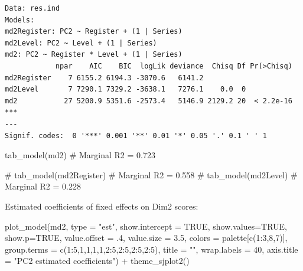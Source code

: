 \documentclass[
  letterpaper,
  DIV=11,
  numbers=noendperiod]{scrreprt}
\newenvironment{Shaded}{\begin{snugshade}}{\end{snugshade}}
\newcommand{\AttributeTok}[1]{\textcolor[rgb]{0.40,0.45,0.13}{#1}}
\newcommand{\CommentTok}[1]{\textcolor[rgb]{0.37,0.37,0.37}{#1}}
\newcommand{\ConstantTok}[1]{\textcolor[rgb]{0.56,0.35,0.01}{#1}}
\newcommand{\DecValTok}[1]{\textcolor[rgb]{0.68,0.00,0.00}{#1}}
\newcommand{\FloatTok}[1]{\textcolor[rgb]{0.68,0.00,0.00}{#1}}
\newcommand{\FunctionTok}[1]{\textcolor[rgb]{0.28,0.35,0.67}{#1}}
\newcommand{\NormalTok}[1]{\textcolor[rgb]{0.00,0.23,0.31}{#1}}
\newcommand{\SpecialCharTok}[1]{\textcolor[rgb]{0.37,0.37,0.37}{#1}}
\newcommand{\StringTok}[1]{\textcolor[rgb]{0.13,0.47,0.30}{#1}}
\begin{document}
\begin{verbatim}
Data: res.ind
Models:
md2Register: PC2 ~ Register + (1 | Series)
md2Level: PC2 ~ Level + (1 | Series)
md2: PC2 ~ Register * Level + (1 | Series)
            npar    AIC    BIC  logLik deviance  Chisq Df Pr(>Chisq)    
md2Register    7 6155.2 6194.3 -3070.6   6141.2                         
md2Level       7 7290.1 7329.2 -3638.1   7276.1    0.0  0               
md2           27 5200.9 5351.6 -2573.4   5146.9 2129.2 20  < 2.2e-16 ***
---
Signif. codes:  0 '***' 0.001 '**' 0.01 '*' 0.05 '.' 0.1 ' ' 1
\end{verbatim}

\begin{Shaded}
\begin{Highlighting}[]
\FunctionTok{tab\_model}\NormalTok{(md2) }\CommentTok{\# Marginal R2 = 0.723}
\end{Highlighting}
\end{Shaded}

\begin{Shaded}
\begin{Highlighting}[]
\CommentTok{\# tab\_model(md2Register) \# Marginal R2 = 0.558}
\CommentTok{\# tab\_model(md2Level) \# Marginal R2 = 0.228}
\end{Highlighting}
\end{Shaded}

Estimated coefficients of fixed effects on Dim2 scores:

\begin{Shaded}
\begin{Highlighting}[]
\FunctionTok{plot\_model}\NormalTok{(md2, }
           \AttributeTok{type =} \StringTok{"est"}\NormalTok{,}
           \AttributeTok{show.intercept =} \ConstantTok{TRUE}\NormalTok{,}
           \AttributeTok{show.values=}\ConstantTok{TRUE}\NormalTok{, }
           \AttributeTok{show.p=}\ConstantTok{TRUE}\NormalTok{,}
           \AttributeTok{value.offset =}\NormalTok{ .}\DecValTok{4}\NormalTok{,}
           \AttributeTok{value.size =} \FloatTok{3.5}\NormalTok{,}
           \AttributeTok{colors =}\NormalTok{ palette[}\FunctionTok{c}\NormalTok{(}\DecValTok{1}\SpecialCharTok{:}\DecValTok{3}\NormalTok{,}\DecValTok{8}\NormalTok{,}\DecValTok{7}\NormalTok{)],}
           \AttributeTok{group.terms =} \FunctionTok{c}\NormalTok{(}\DecValTok{1}\SpecialCharTok{:}\DecValTok{5}\NormalTok{,}\DecValTok{1}\NormalTok{,}\DecValTok{1}\NormalTok{,}\DecValTok{1}\NormalTok{,}\DecValTok{1}\NormalTok{,}\DecValTok{2}\SpecialCharTok{:}\DecValTok{5}\NormalTok{,}\DecValTok{2}\SpecialCharTok{:}\DecValTok{5}\NormalTok{,}\DecValTok{2}\SpecialCharTok{:}\DecValTok{5}\NormalTok{,}\DecValTok{2}\SpecialCharTok{:}\DecValTok{5}\NormalTok{), }
           \AttributeTok{title =} \StringTok{""}\NormalTok{,}
           \AttributeTok{wrap.labels =} \DecValTok{40}\NormalTok{,}
           \AttributeTok{axis.title =} \StringTok{"PC2 estimated coefficients"}\NormalTok{) }\SpecialCharTok{+}
  \FunctionTok{theme\_sjplot2}\NormalTok{() }
\end{Highlighting}
\end{Shaded}
\end{document}

